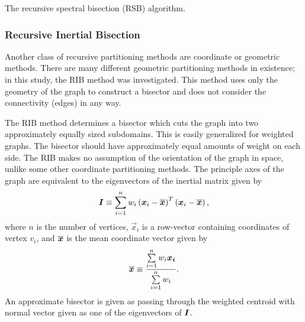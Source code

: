 {{{{        \begin{algorithm}
          \centering
          \caption{The recursive spectral bisection (RSB) algorithm.}
          \label{alg:Recursive Spectral Bisection}
          \begin{algorithmic}[1]
               
            \EndProcedure
          \end{algorithmic}
        \end{algorithm}
      }
      \subsubsection{Recursive Inertial Bisection}{\label{sssec:Spatial Decomposition:Recursive Inertial Bisection}
        Another class of recursive partitioning methods are coordinate or geometric methods.
        There are many different geometric partitioning methods in existence; in this study, the \ac{RIB} method \cite{Elsner1997,Floros1995} was investigated.
        This method uses only the geometry of the graph to construct a bisector and does not consider the connectivity (edges) in any way.

        The \ac{RIB} method determines a bisector which cuts the graph into two approximately equally sized subdomains.
        This is easily generalized for weighted graphs.
        The bisector should have approximately equal amounts of weight on each side.
        The \ac{RIB} makes no assumption of the orientation of the graph in space, unlike some other coordinate partitioning methods.
        The principle axes of the graph are equivalent to the eigenvectors of the inertial matrix given by
        \begin{equation}
          \label{eq:Spatial Decomposition:Inertial Matrix}
          \mat{I} \defined \suml[i=1][n] w_i\left(\vec{x}_i-\avg{\vec{x}}\right)^T\left(\vec{x}_i-\avg{\vec{x}}\right),
        \end{equation}
        where $n$ is the number of vertices, $\vec{x}_i$ is a row-vector containing coordinates of vertex $v_i$, and $\overline{\boldsymbol{x}}$ is the mean coordinate vector given by
        \begin{equation}
          \label{eq:Spatial Decomposition:Mean Coordinates}
          \avg{\vec{x}} \defined \frac{\suml[i=1][n] w_i \vec{x_i}}{\suml[i=1][n] w_i}.
        \end{equation}
        An approximate bisector is given as passing through the weighted centroid with normal vector given as one of the eigenvectors of $\boldsymbol{I}$.

}}}}
